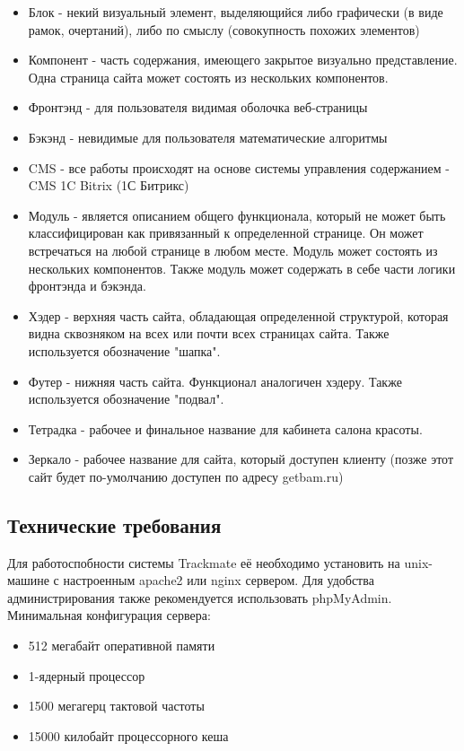 \documentclass[DIV=calc, paper=a4, fontsize=11pt]{scrartcl} %
\begin{document}
        \begin{itemize}
        \item Блок - некий визуальный элемент, выделяющийся либо графически (в виде рамок, очертаний), либо по смыслу (совокупность похожих элементов)
        \item Компонент - часть содержания, имеющего закрытое визуально представление. Одна страница сайта может состоять из нескольких компонентов.
        \item Фронтэнд - для пользователя видимая оболочка веб-страницы
        \item Бэкэнд - невидимые для пользователя математические алгоритмы
        \item CMS - все работы происходят на основе системы управления содержанием - CMS 1C Bitrix (1С Битрикс)
        \item Модуль - является описанием общего функционала, который не может быть классифицирован как привязанный к определенной странице. Он может встречаться на любой странице в любом месте. Модуль может состоять из нескольких компонентов. Также модуль может содержать в себе части логики фронтэнда и бэкэнда.
        \item Хэдер - верхняя часть сайта, обладающая определенной структурой, которая видна сквозняком на всех или почти всех страницах сайта. Также используется обозначение "шапка".
        \item Футер - нижняя часть сайта. Функционал аналогичен хэдеру. Также используется обозначение "подвал".
        \item Тетрадка - рабочее и финальное название для кабинета салона красоты.
        \item Зеркало - рабочее название для сайта, который доступен клиенту (позже этот сайт будет по-умолчанию доступен по адресу getbam.ru)
    \end{itemize}
    
\subsection{Технические требования}
Для работоспобности системы Trackmate её необходимо установить на unix-машине с настроенным apache2 или nginx сервером.
Для удобства администрирования также рекомендуется использовать phpMyAdmin.
\\[0.5cm]
Минимальная конфигурация сервера:
\begin{itemize}
	\item 512 мегабайт оперативной памяти
	\item 1-ядерный процессор
	\item 1500 мегагерц тактовой частоты
	\item 15000 килобайт процессорного кеша
\end{itemize}
\end{document}
